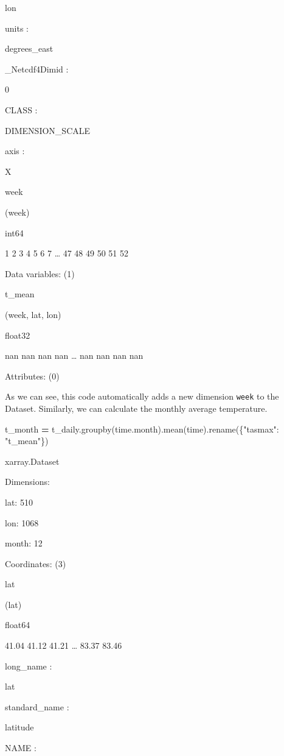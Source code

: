 \documentclass[
]{book}
\newenvironment{Shaded}{\begin{snugshade}}{\end{snugshade}}
\newcommand{\NormalTok}[1]{#1}
\newcommand{\OperatorTok}[1]{\textcolor[rgb]{0.81,0.36,0.00}{\textbf{#1}}}
\newcommand{\StringTok}[1]{\textcolor[rgb]{0.31,0.60,0.02}{#1}}
\begin{document}
lon

{units :}

degrees\_east

\_Netcdf4Dimid :

0

{CLASS :}

DIMENSION\_SCALE

{axis :}

X

{week}

(week)

int64

1 2 3 4 5 6 7 \ldots{} 47 48 49 50 51 52

Data variables: {(1)}

{t\_mean}

(week, lat, lon)

float32

nan nan nan nan \ldots{} nan nan nan nan

Attributes: {(0)}

As we can see, this code automatically adds a new dimension \texttt{week} to the Dataset. Similarly, we can calculate the monthly average temperature.

\begin{Shaded}
\begin{Highlighting}[]
\NormalTok{t\_month }\OperatorTok{=}\NormalTok{ t\_daily.groupby(}\StringTok{\textquotesingle{}time.month\textquotesingle{}}\NormalTok{).mean(}\StringTok{\textquotesingle{}time\textquotesingle{}}\NormalTok{).rename(\{}\StringTok{"tasmax"}\NormalTok{: }\StringTok{"t\_mean"}\NormalTok{\})}
\end{Highlighting}
\end{Shaded}

xarray.Dataset

Dimensions:

{lat}: 510

{lon}: 1068

{month}: 12

Coordinates: {(3)}

{lat}

(lat)

float64

41.04 41.12 41.21 \ldots{} 83.37 83.46

{long\_name :}

lat

{standard\_name :}

latitude

{NAME :}
\end{document}
